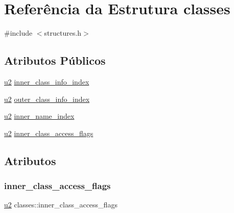 \hypertarget{structclasses}{}\section{Referência da Estrutura classes}
\label{structclasses}


{\ttfamily \#include $<$structures.\+h$>$}

\subsection*{Atributos Públicos}
\begin{DoxyCompactItemize}
\item 
\hyperlink{lista__operandos_8h_a732cde1300aafb73b0ea6c2558a7a54f}{u2} \hyperlink{structclasses_a0b0500d3d12c2572e38ec03f4eb018cd}{inner\+\_\+class\+\_\+info\+\_\+index}
\item 
\hyperlink{lista__operandos_8h_a732cde1300aafb73b0ea6c2558a7a54f}{u2} \hyperlink{structclasses_a0f25ecea2b18dfbcf23e4a6975eb1f21}{outer\+\_\+class\+\_\+info\+\_\+index}
\item 
\hyperlink{lista__operandos_8h_a732cde1300aafb73b0ea6c2558a7a54f}{u2} \hyperlink{structclasses_a8cdb61a61adc9fc0d99acc9be0915187}{inner\+\_\+name\+\_\+index}
\item 
\hyperlink{lista__operandos_8h_a732cde1300aafb73b0ea6c2558a7a54f}{u2} \hyperlink{structclasses_a493162e441680c04b835a3b31a371e5c}{inner\+\_\+class\+\_\+access\+\_\+flags}
\end{DoxyCompactItemize}


\subsection{Atributos}
\mbox{\label{structclasses_a493162e441680c04b835a3b31a371e5c}} 
\subsubsection{\texorpdfstring{inner\+\_\+class\+\_\+access\+\_\+flags}{inner\_class\_access\_flags}}
{\footnotesize\ttfamily \hyperlink{lista__operandos_8h_a732cde1300aafb73b0ea6c2558a7a54f}{u2} classes\+::inner\+\_\+class\+\_\+access\+\_\+flags}

\mbox{\label{structclasses_a0b0500d3d12c2572e38ec03f4eb018cd}} 

